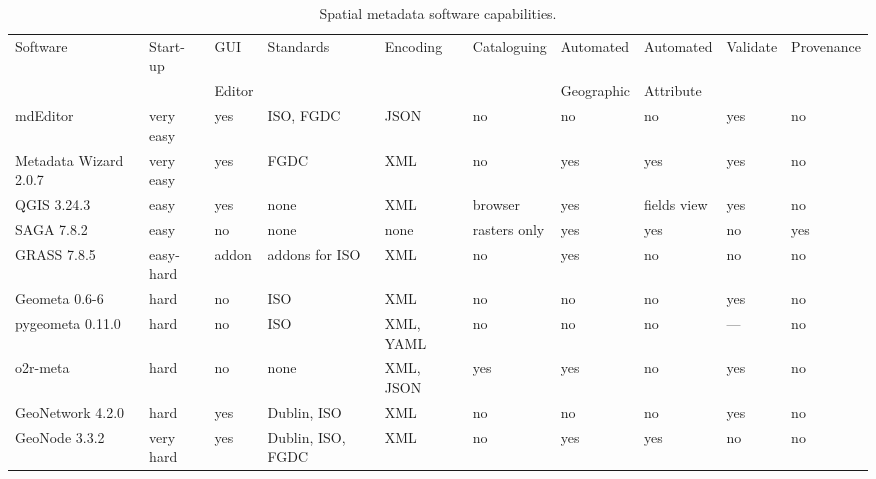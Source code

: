 \documentclass{isprs} %
\begin{document}
\begin{table*}[ht!]
    \centering
    \begin{tabular}{p{1.3cm}p{1.3cm}p{1.1cm}p{1.3cm}p{1.3cm}p{1.3cm}p{1.3cm}p{1.3cm}p{1.2cm}p{1.3cm}}
    \hline
         Software     & Start-up & GUI  & Standards & Encoding & Cataloguing & Automated   & Automated & Validate  & Provenance  \\
                                &          &  Editor &        &        &     & Geographic  & Attribute &           &               \\ [1mm]
        \hline
        mdEditor                & very easy & yes & ISO, FGDC & JSON                & no            & no    & no    & yes & no  \\ [0.5cm]
        Metadata Wizard 2.0.7   & very easy & yes & FGDC    & XML                  & no            & yes   & yes   & yes & no  \\ [0.5cm]
        QGIS 3.24.3             & easy      & yes & none         & XML             & browser       & yes   & fields view & yes & no  \\ [0.5cm]
        SAGA 7.8.2              & easy      & no & none          & none            & rasters only  & yes   & yes & no & yes  \\ [0.5cm]
        GRASS 7.8.5             & easy-hard & addon & addons for ISO  & XML          & no            & yes   & no    & no & no \\ [0.5cm]
        Geometa 0.6-6           & hard      & no & ISO  & XML                     & no            & no    & no & yes & no  \\ [0.5cm]
        pygeometa 0.11.0        & hard      & no & ISO  & XML, YAML                     & no            & no    & no & --- & no  \\ [0.5cm]
        o2r-meta                & hard      & no & none & XML, JSON                     & yes           & yes   & no & yes & no  \\ [0.5cm]
        GeoNetwork 4.2.0        & hard      & yes & Dublin, ISO & XML         & no            & no    & no & yes & no \\ [0.5cm]
        GeoNode 3.3.2           & very hard & yes & Dublin, ISO, FGDC & XML    & no            & yes   & yes & no & no  \\ 
        \hline
    \end{tabular}
\caption{Spatial metadata software capabilities.}
\label{tab:Metadata_Software}
\end{table*}
\end{document}

